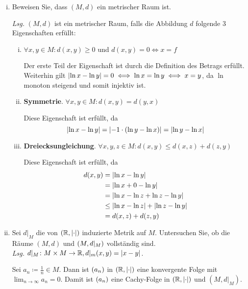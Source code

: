 \documentclass{scrreprt}
\begin{document}
\begin{enumerate}[(i)]
\item Beweisen Sie, dass $(M, d)$ ein metrischer Raum ist.

  \textit{Lsg.} $(M, d)$ ist ein metrischer Raum, falls die Abbildung $d$ folgende 3 Eigenschaften
  erfüllt:
  \begin{enumerate}[(i)]
  \item $\forall x, y \in M \colon d(x, y) \geq 0$ und $d(x, y) = 0 \iff x = f$

    Der erste Teil der Eigenschaft ist durch die Definition des Betrags erfüllt.
    Weiterhin  gilt $\abs{\ln x - \ln y} = 0 \iff \ln x = \ln y \iff x = y$,
    da $\ln$ monoton steigend und somit injektiv ist.

  \item \textbf{Symmetrie}. $\forall x, y \in M \colon d(x, y) = d(y, x)$

    Diese Eigenschaft ist erfüllt, da
    \[
      \abs{\ln x - \ln y} = \abs{-1 \cdot (\ln y - \ln x)} = \abs{\ln y - \ln x}
    \]

  \item \textbf{Dreiecksungleichung}. $\forall x, y, z \in M \colon d(x, y) \leq d(x, z) + d(z, y)$

    Diese Eigenschaft ist erfüllt, da
    \begin{align*}
      d(x, y) &= \abs{\ln x - \ln y} \\
              &= \abs{\ln x + 0 - \ln y} \\
              &= \abs{\ln x - \ln z + \ln z -  \ln y} \\
              &\leq \abs{\ln x - \ln z} + \abs{\ln z - \ln y} \\
              &= d(x, z) + d(z, y)
    \end{align*}
  \end{enumerate}

\item Sei $d|_M$ die von $(\mathbb{R}, \abs{\cdot})$ induzierte Metrik auf $M$.
  Untersuchen Sie, ob die Räume $(M, d)$ und $\qty(M, d|_M)$ vollständig sind. \\

  \textit{Lsg.} $d|_M \colon M \times M \to \mathbb{R}, d|_m(x, y) = \abs{x - y}$.

  Sei $a_n \coloneqq \frac{1}{n} \in M$.
  Dann ist $\qty(a_n)$ in $(\mathbb{R}, \abs{\cdot})$ eine konvergente Folge mit
  $\lim_{n \to \infty} a_n = 0$.
  Damit ist $\qty(a_n)$ eine Cachy-Folge in $(\mathbb{R}, \abs{\cdot})$ und $(M, d|_M)$.


\end{enumerate}
\end{document}
